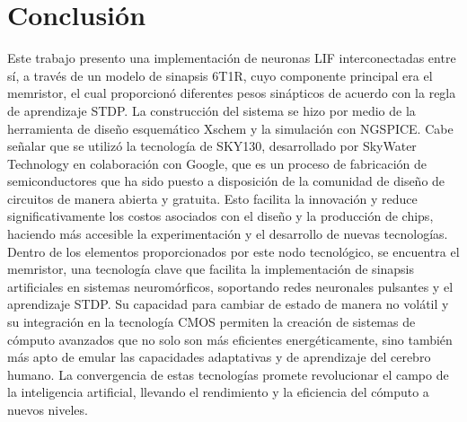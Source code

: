 \documentclass[conference]{IEEEtran}
\begin{document}
\section*{Conclusión}

Este trabajo presento una implementación de neuronas LIF interconectadas entre sí, a través de un modelo de sinapsis 6T1R, cuyo componente principal era el memristor, el cual proporcionó diferentes pesos sinápticos de acuerdo con la regla de aprendizaje STDP. La construcción del sistema se hizo por medio de la herramienta de diseño esquemático Xschem y la simulación con NGSPICE. Cabe señalar que se utilizó la tecnología de SKY130, desarrollado por SkyWater Technology en colaboración con Google, que es un proceso de fabricación de semiconductores que ha sido puesto a disposición de la comunidad de diseño de circuitos de manera abierta y gratuita. Esto facilita la innovación y reduce significativamente los costos asociados con el diseño y la producción de chips, haciendo más accesible la experimentación y el desarrollo de nuevas tecnologías. Dentro de los elementos proporcionados por este nodo tecnológico, se encuentra el memristor, una tecnología clave que facilita la implementación de sinapsis artificiales en sistemas neuromórficos, soportando redes neuronales pulsantes y el aprendizaje STDP. Su capacidad para cambiar de estado de manera no volátil y su integración en la tecnología CMOS permiten la creación de sistemas de cómputo avanzados que no solo son más eficientes energéticamente, sino también más apto de emular las capacidades adaptativas y de aprendizaje del cerebro humano. La convergencia de estas tecnologías promete revolucionar el campo de la inteligencia artificial, llevando el rendimiento y la eficiencia del cómputo a nuevos niveles.



\end{document}
